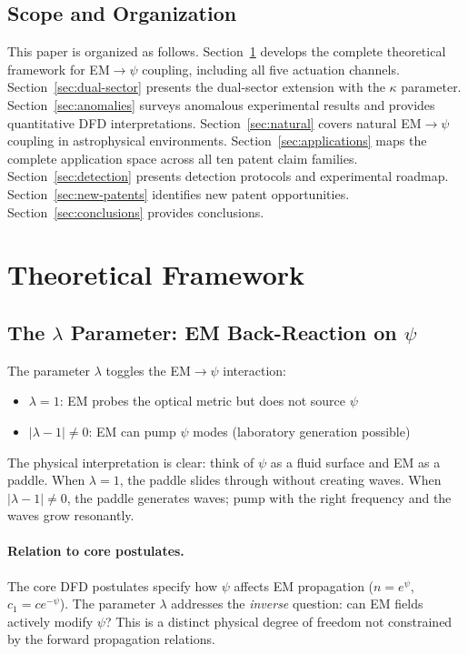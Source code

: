 \documentclass[aps,prd,twocolumn,superscriptaddress,floatfix,nofootinbib]{revtex4-2}
\begin{document}
\subsection{Scope and Organization}

This paper is organized as follows. Section~\ref{sec:theory} develops the
complete theoretical framework for EM$\to\psi$ coupling, including all
five actuation channels. Section~\ref{sec:dual-sector} presents the
dual-sector extension with the $\kappa$ parameter.
Section~\ref{sec:anomalies} surveys anomalous experimental results and
provides quantitative DFD interpretations. Section~\ref{sec:natural}
covers natural EM$\to\psi$ coupling in astrophysical environments.
Section~\ref{sec:applications} maps the complete application space across
all ten patent claim families. Section~\ref{sec:detection} presents
detection protocols and experimental roadmap.
Section~\ref{sec:new-patents} identifies new patent opportunities.
Section~\ref{sec:conclusions} provides conclusions.

\section{Theoretical Framework}\label{sec:theory}

\subsection{The $\lambda$ Parameter: EM Back-Reaction on $\psi$}

The parameter $\lambda$ toggles the EM$\to\psi$ interaction:
\begin{itemize}[nosep]
\item $\lambda = 1$: EM probes the optical metric but does not source $\psi$
\item $|\lambda - 1| \neq 0$: EM can pump $\psi$ modes (laboratory generation possible)
\end{itemize}

The physical interpretation is clear: think of $\psi$ as a fluid surface
and EM as a paddle. When $\lambda = 1$, the paddle slides through without
creating waves. When $|\lambda - 1| \neq 0$, the paddle generates waves;
pump with the right frequency and the waves grow resonantly.

\paragraph{Relation to core postulates.}
The core DFD postulates specify how $\psi$ affects EM propagation
($n = e^\psi$, $c_1 = ce^{-\psi}$). The parameter $\lambda$ addresses
the \emph{inverse} question: can EM fields actively modify $\psi$? This
is a distinct physical degree of freedom not constrained by the forward
propagation relations.
\end{document}
